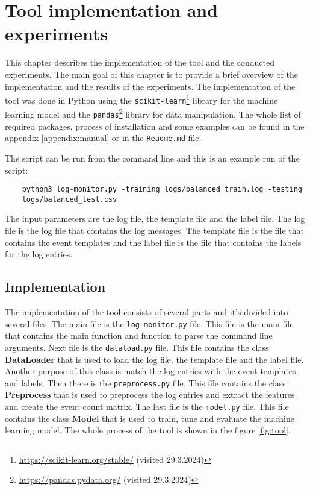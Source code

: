 \chapter{Tool implementation and experiments}

This chapter describes the implementation of the tool and the conducted experiments. 
The main goal of this chapter is to provide a brief overview of the implementation and the results of the experiments.
The implementation of the tool was done in Python using the \texttt{scikit-learn}\footnote{\url{https://scikit-learn.org/stable/} (visited 29.3.2024)}
library for the machine learning model and the \texttt{pandas}\footnote{\url{https://pandas.pydata.org/} (visited 29.3.2024)} library for data manipulation.
The whole list of required packages, process of installation and some examples can be found in the appendix \ref{appendix:manual} or in the \texttt{Readme.md} file.

The script can be run from the command line and this is an example run of the script:
\begin{verbatim}
    python3 log-monitor.py -training logs/balanced_train.log -testing 
    logs/balanced_test.csv
\end{verbatim}

The input parameters are the log file, the template file and the label file. The log file is the log file that contains the log messages. 
The template file is the file that contains the event templates and the label file is the file that contains the labels for the log entries.

\section{Implementation}

The implementation of the tool consists of several parts and it's divided into several files. 
The main file is the \texttt{log-monitor.py} file. This file is the main file that contains the main function and function to parse the command line arguments.
Next file is the \texttt{dataload.py} file. This file contains the class \textbf{DataLoader} that is used to load the log file, the template file and the label file. Another
purpose of this class is match the log entries with the event templates and labels.
Then there is the \texttt{preprocess.py} file. This file contains the class \textbf{Preprocess} that is used to preprocess the log entries and extract the features and create the 
event count matrix. 
The last file is the \texttt{model.py} file. This file contains the class \textbf{Model} that is used to train, tune and evaluate the machine learning model.
The whole process of the tool is shown in the figure \ref{fig:tool}.

